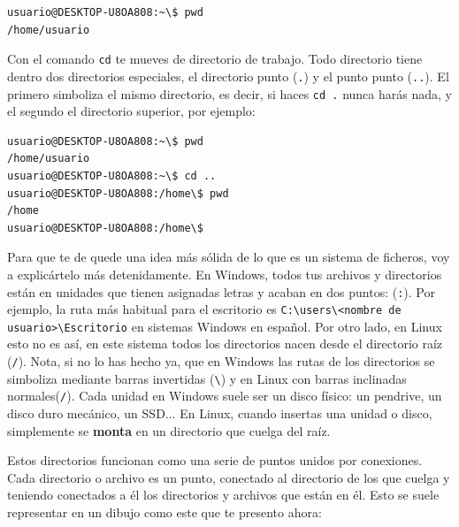 \documentclass[a4paper]{article}
\begin{document}
\noindent
\begin{minipage}[H]{\linewidth}
\mbox{}
\begin{lstlisting}[style=terminalStyle]
usuario@DESKTOP-U8OA808:~\$ pwd
/home/usuario
\end{lstlisting}
\end{minipage}

Con el comando \verb!cd! te mueves de directorio de trabajo. Todo directorio
tiene dentro dos directorios especiales, el directorio punto (\verb!.!) y el
punto punto (\verb!..!). El primero simboliza el mismo directorio, es decir,
si haces \verb!cd .! nunca harás nada, y el segundo el directorio superior,
por ejemplo:

\noindent
\begin{minipage}[H]{\linewidth}
\mbox{}
\begin{lstlisting}[style=terminalStyle]
usuario@DESKTOP-U8OA808:~\$ pwd
/home/usuario
usuario@DESKTOP-U8OA808:~\$ cd ..
usuario@DESKTOP-U8OA808:/home\$ pwd
/home
usuario@DESKTOP-U8OA808:/home\$
\end{lstlisting}
\end{minipage}

Para que te de quede una idea más sólida de lo que es un sistema de ficheros,
voy a explicártelo más detenidamente. En Windows, todos tus archivos y
directorios están en unidades que tienen asignadas letras y acaban en dos
puntos: (\verb!:!). Por ejemplo, la ruta más habitual para el escritorio es
\verb!C:\users\<nombre de usuario>\Escritorio! en sistemas Windows en español.
Por otro
lado, en Linux esto no es así, en este sistema todos los directorios nacen
desde el directorio raíz (\verb!/!). Nota, si no lo has hecho ya, que en Windows
las rutas de los directorios se simboliza mediante barras invertidas (\verb!\!)
y en Linux con barras inclinadas normales(\verb!/!).
Cada unidad en Windows suele ser un
disco físico: un pendrive, un disco duro mecánico, un SSD... En Linux, cuando
insertas una unidad o disco, simplemente se \textbf{monta} en un
directorio que cuelga del raíz.

Estos directorios funcionan como una serie de puntos unidos por conexiones.
Cada directorio o archivo es un punto, conectado al directorio de los que
cuelga y teniendo conectados a él los directorios y archivos que están en él.
Esto se suele representar en un dibujo como este que te presento ahora:
\end{document}

